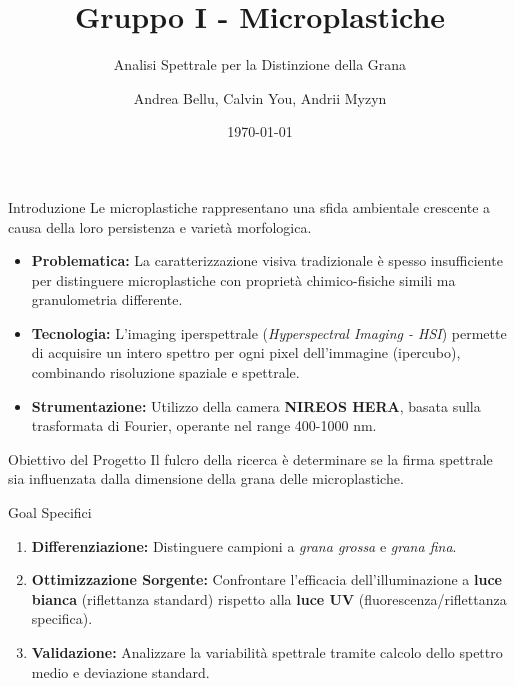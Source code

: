 \documentclass[aspectratio=169]{beamer}
\title{Gruppo I - Microplastiche}
\subtitle{Analisi Spettrale per la Distinzione della Grana}
\author{Andrea Bellu, Calvin You, Andrii Myzyn}
\date{\today}
\begin{document}
\begin{frame}
    \titlepage
\end{frame}

\begin{frame}{Introduzione}
    Le microplastiche rappresentano una sfida ambientale crescente a causa della loro persistenza e varietà morfologica. 
    \vfill
    \begin{itemize}
        \item \textbf{Problematica:} La caratterizzazione visiva tradizionale è spesso insufficiente per distinguere microplastiche con proprietà chimico-fisiche simili ma granulometria differente.
        \item \textbf{Tecnologia:} L'imaging iperspettrale (\textit{Hyperspectral Imaging - HSI}) permette di acquisire un intero spettro per ogni pixel dell'immagine (ipercubo), combinando risoluzione spaziale e spettrale.
        \item \textbf{Strumentazione:} Utilizzo della camera \textbf{NIREOS HERA}, basata sulla trasformata di Fourier, operante nel range 400-1000 nm.
    \end{itemize}
\end{frame}

\begin{frame}{Obiettivo del Progetto}
    Il fulcro della ricerca è determinare se la firma spettrale sia influenzata dalla dimensione della grana delle microplastiche.
    \vfill
    \begin{block}{Goal Specifici}
        \begin{enumerate}
            \item \textbf{Differenziazione:} Distinguere campioni a \textit{grana grossa} e \textit{grana fina}.
            \item \textbf{Ottimizzazione Sorgente:} Confrontare l'efficacia dell'illuminazione a \textbf{luce bianca} (riflettanza standard) rispetto alla \textbf{luce UV} (fluorescenza/riflettanza specifica).
            \item \textbf{Validazione:} Analizzare la variabilità spettrale tramite calcolo dello spettro medio e deviazione standard.
        \end{enumerate}
    \end{block}
\end{frame}
\end{document}
